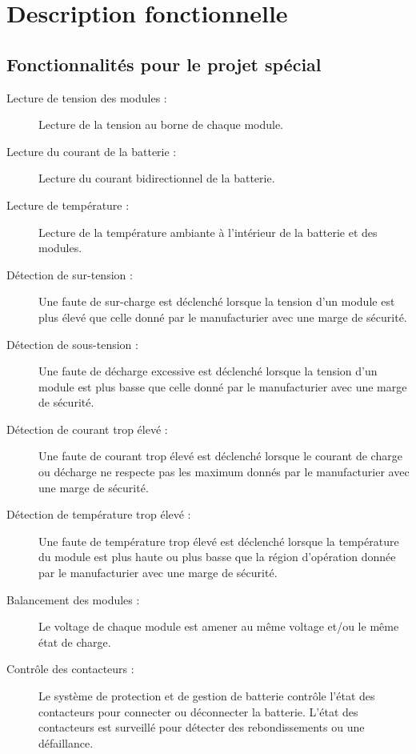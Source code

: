 
\section{Description fonctionnelle}

	\subsection{Fonctionnalités pour le projet spécial}
	
		\begin{description}
			\item [Lecture de tension des modules :] 
			Lecture de la tension au borne de chaque module.
			
			\item [Lecture du courant de la batterie :]
			Lecture du courant bidirectionnel de la batterie.
			
			\item [Lecture de température :]
			Lecture de la température ambiante à l'intérieur de la batterie et des modules. 
			
			\item [Détection de sur-tension :]
			Une faute de sur-charge est déclenché lorsque la tension d'un module est plus élevé que celle donné par le manufacturier avec une marge de sécurité.  
			
			\item [Détection de sous-tension :]
			Une faute de décharge excessive est déclenché lorsque la tension d'un module est plus basse que celle donné par le manufacturier avec une marge de sécurité.
			
			\item [Détection de courant trop élevé :]
			Une faute de courant trop élevé est déclenché lorsque le courant de charge ou décharge ne respecte pas les maximum donnés par le manufacturier avec une marge de sécurité.
			
			\item [Détection de température trop élevé :]
			Une faute de température trop élevé est déclenché lorsque la température du module est plus haute ou plus basse que la région d'opération donnée par le manufacturier avec une marge de sécurité.
						
			\item [Balancement des modules :]
			Le voltage de chaque module est amener au même voltage et/ou le même état de charge.
			
			\item [Contrôle des contacteurs :]
			Le système de protection et de gestion de batterie contrôle l'état des contacteurs pour connecter ou déconnecter la batterie. L'état des contacteurs est surveillé pour détecter des rebondissements ou une défaillance.
			

\end{description}
